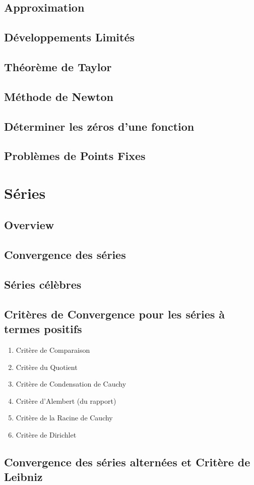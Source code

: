 \documentclass{article}
\begin{document}
\subsection{Approximation}

\subsection{Développements Limités}

\subsection{Théorème de Taylor}

\subsection{Méthode de Newton}


\subsection{Déterminer les zéros d'une fonction}

\subsection{Problèmes de Points Fixes}

\pagebreak
\section{Séries}
\subsection{Overview}


\subsection{Convergence des séries}

\subsection{Séries célèbres}

\subsection{Critères de Convergence pour les séries à termes positifs}

    \begin{enumerate}
	\item Critère de Comparaison
	\item Critère du Quotient
	\item Critère de Condensation de Cauchy
	\item Critère d'Alembert (du rapport)
	\item Critère de la Racine de Cauchy
	\item Critère de Dirichlet
    \end{enumerate}

\subsection{Convergence des séries alternées et Critère de Leibniz}


\pagebreak
\end{document}
